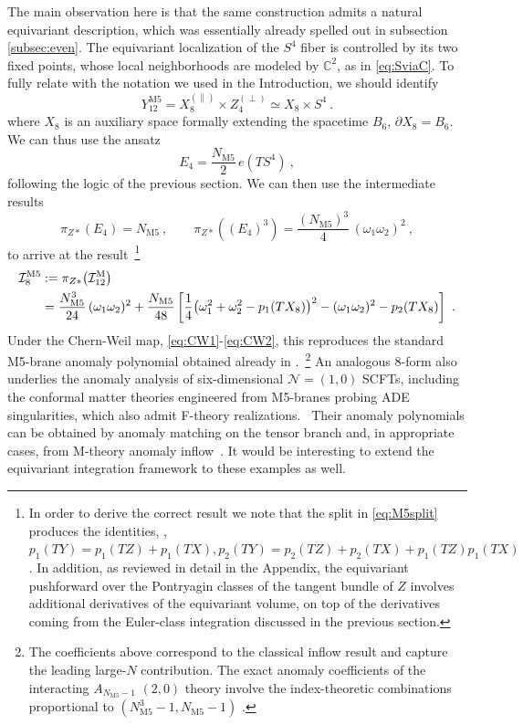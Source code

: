 \documentclass[11pt,a4paper]{article}
\def\cI{{\cal I}}
\theoremstyle{definition}
\theoremstyle{identity}
\theoremstyle{remark}
\newcommand{\be}{\begin{equation}}
\newcommand{\ee}{\end{equation}}
\newcommand{\BC}{\mathbb{C}}
\begin{document}
The main observation here is that the same construction admits a natural equivariant
description, which was essentially already spelled out in subsection \ref{subsec:even}. The equivariant localization of the $S^4$ fiber is controlled by its two fixed
points, whose local neighborhoods are modeled by $\BC^2$, as in \eqref{eq:SviaC}. To fully relate with the notation we used in the Introduction, we should identify
\be
   \label{eq:M5split} Y_{12}^\text{M5}=X_8^{(\parallel)}\times Z_4^{(\perp)}
\simeq
X_8 \times S^4\ .
\ee
where $X_8$ is an auxiliary space formally extending the spacetime $B_6$, $\partial X_8 = B_6$. We can thus use the ansatz 
\be
    E_4 = \frac{N_\text{M5}}2\, e(TS^{4})\ ,
\ee
following the logic of the previous section. We can then use the intermediate results
\be
    \pi_{Z*} (E_4) = N_\text{M5}\ , \qquad \pi_{Z*} ((E_4)^3) = \frac{(N_\text{M5})^3}4\, (\omega_1 \omega_2)^2\ ,
\ee
to arrive at the result~\footnote{In order to derive the correct result we note that the split in \eqref{eq:M5split} produces the identities, \cite{Witten:1996hc}, $p_1 (TY) = p_1(TZ) + p_1 (TX), p_2(TY) = p_2(TZ) + p_2(TX) +p_1(TZ) p_1(TX)$. In addition, as reviewed in detail in the Appendix, the equivariant pushforward over the Pontryagin classes of the tangent bundle of $Z$ involves additional derivatives of the equivariant volume, on top of the derivatives coming from the Euler-class integration discussed in the previous section.}
\be
\label{eq:I8fromBC}
\begin{split}
\cI_8^{\rm M5}
&:=
\pi_{Z*}\!\left(\cI_{12}^{\rm M}\right)
\\
&=
\frac{N_\text{M5}^3}{24}\,(\omega_1\omega_2)^2
+
\frac{N_\text{M5}}{48}
\left[
\frac14
\bigl(\omega_1^2+\omega_2^2-p_1(TX_8)\bigr)^2
-
(\omega_1\omega_2)^2
-
p_2(TX_8)
\right]\ .
\end{split}
\ee
Under the Chern-Weil map, \eqref{eq:CW1}-\eqref{eq:CW2}, this reproduces the standard M5-brane anomaly polynomial
obtained already in \cite{Harvey:1998bx}.~\footnote{The coefficients above correspond to the classical inflow result and capture the
leading large-$N$ contribution. The exact anomaly coefficients of the interacting
$A_{N_\text{M5}-1}$ $(2,0)$ theory involve the index-theoretic combinations proportional to
$(N_\text{M5}^3-1,N_\text{M5}-1)$
\cite{Intriligator:2000eq,Yi:2001bz,Ohmori:2014kda}.} An analogous $8$-form also underlies the anomaly analysis of six-dimensional $\mathcal N=(1,0)$ SCFTs, including the conformal matter theories engineered from M5-branes probing ADE singularities, which also admit F-theory realizations.~\cite{Ohmori:2014kda,DelZotto:2014hpa} Their anomaly polynomials can be obtained by anomaly matching on the tensor branch and, in appropriate cases, from M-theory anomaly inflow~\cite{Ohmori:2014kda}. It would be interesting to extend the equivariant integration framework to these examples as well.
\end{document}
